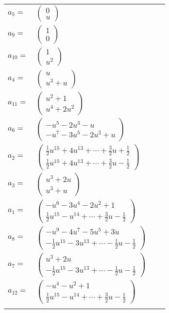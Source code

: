 \documentclass[1p]{elsarticle_modified}
\theoremstyle{definition}
\begin{document}
\begin{tabular}{m{7pt} m{180pt} m{7pt} m{180pt} }
\flushright $a_{5}=$&$\begin{pmatrix}0\\u\end{pmatrix}$ \\
\flushright $a_{9}=$&$\begin{pmatrix}1\\0\end{pmatrix}$ \\
\flushright $a_{10}=$&$\begin{pmatrix}1\\u^2\end{pmatrix}$ \\
\flushright $a_{4}=$&$\begin{pmatrix}u\\u^3+u\end{pmatrix}$ \\
\flushright $a_{11}=$&$\begin{pmatrix}u^2+1\\u^4+2 u^2\end{pmatrix}$ \\
\flushright $a_{6}=$&$\begin{pmatrix}- u^5-2 u^3- u\\- u^7-3 u^5-2 u^3+u\end{pmatrix}$ \\
\flushright $a_{2}=$&$\begin{pmatrix}\frac{1}{2} u^{15}+4 u^{13}+\cdots+\frac{3}{2} u+\frac{1}{2}\\\frac{1}{2} u^{15}+4 u^{13}+\cdots+\frac{3}{2} u-\frac{1}{2}\end{pmatrix}$ \\
\flushright $a_{3}=$&$\begin{pmatrix}u^3+2 u\\u^3+u\end{pmatrix}$ \\
\flushright $a_{1}=$&$\begin{pmatrix}- u^6-3 u^4-2 u^2+1\\\frac{1}{2} u^{15}- u^{14}+\cdots+\frac{3}{2} u-\frac{1}{2}\end{pmatrix}$ \\
\flushright $a_{8}=$&$\begin{pmatrix}- u^9-4 u^7-5 u^5+3 u\\-\frac{1}{2} u^{15}-3 u^{13}+\cdots-\frac{1}{2} u-\frac{1}{2}\end{pmatrix}$ \\
\flushright $a_{7}=$&$\begin{pmatrix}u^3+2 u\\-\frac{1}{2} u^{15}-3 u^{13}+\cdots-\frac{1}{2} u-\frac{1}{2}\end{pmatrix}$ \\
\flushright $a_{12}=$&$\begin{pmatrix}- u^4- u^2+1\\\frac{1}{2} u^{15}- u^{14}+\cdots+\frac{3}{2} u-\frac{1}{2}\end{pmatrix}$\\&\end{tabular}
\end{document}
